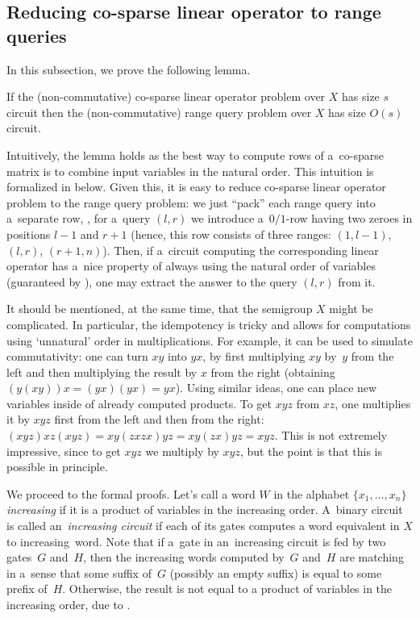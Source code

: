 \documentclass{toc}
\begin{document}
\subsection{Reducing
    co-sparse
    linear operator to range queries} \label{sec:operators_to_queries}
In this subsection, we prove the following lemma.

\begin{lemma} \label{lem:dense_matrices}
    If the (non-commutative)
    co-sparse
    linear operator problem over $X$ has size $s$
    circuit then the (non-commutative)
    range query
    problem over $X$ has size
    $O(s)$ circuit.
\end{lemma}

Intuitively, the lemma holds as the best way to compute rows of
%
%
a~co-sparse
matrix is to combine input variables in the natural order. This intuition is formalized in  below. Given this, it is easy to reduce
%
%
co-sparse
linear operator problem to the
%
%
range query
problem: we just ``pack'' each range query into a~separate row, \ie, for a~query $(l,r)$ we introduce a~$0/1$-row having two zeroes in positions $l-1$ and $r+1$ (hence, this row consists of three ranges: $(1,l-1)$, $(l,r)$, $(r+1,n)$). Then, if a~circuit computing the corresponding linear operator has a~nice property of always using the natural order of variables (guaranteed by ), one may extract the answer to the query $(l,r)$ from it.


It should be mentioned, at the same time, that the semigroup $X$ might be complicated.
In particular, the idempotency is tricky and allows for computations using `unnatural' order in multiplications. For example, it can be used to simulate commutativity: one can turn $xy$ into $yx$, by first multiplying $xy$ by~$y$ from the left and then multiplying the result by $x$ from the right (obtaining $(y(xy))x=(yx)(yx)=yx$). Using similar ideas, one can place new variables inside of already computed products. To get $xyz$ from $xz$, one multiplies it by $xyz$ first from the left and then from the right: $(xyz)xz(xyz)=xy(zxzx)yz=xy(zx)yz=xyz$.
This is not extremely impressive, since to get $xyz$ we multiply by $xyz$, but the point is that this is possible in principle.

We proceed to the formal proofs. Let's call a word $W$ in the alphabet $\{x_1,\ldots,x_n\}$ \emph{increasing} if it is a product of variables in the increasing order. A~binary circuit is called an~\emph{increasing circuit} if each of its gates computes a word equivalent in $X$ to increasing~word.
Note that if a~gate in an~increasing circuit is fed by two gates~$G$ and~$H$, then the increasing words computed by~$G$ and~$H$ are matching in a~sense that some suffix of~$G$ (possibly an empty suffix) is equal to some prefix of~$H$. Otherwise, the result is not equal to a product of variables in the increasing order, due to .
\end{document}
